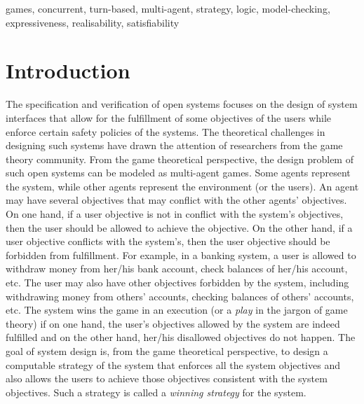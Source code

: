 \documentclass[11pt]{article}
\begin{document}
games, concurrent, turn-based, multi-agent, strategy,  
logic, model-checking, expressiveness, realisability, satisfiability 


\section{Introduction}

The specification and verification of open systems
focuses on the design of system interfaces that allow 
for the fulfillment of some objectives of the users while 
enforce certain safety policies of the systems.
The theoretical challenges in designing such systems 
have drawn the attention of researchers from the game theory community.  
From the game theoretical perspective, the design problem 
of such open systems can be modeled as multi-agent games.  
Some agents represent the system, while 
other agents represent the environment (or the users).  
An agent may have several objectives that may conflict with the other agents' objectives. 
On one hand, if a user objective is not in conflict with the system's objectives, then 
the user should be allowed to achieve the objective. 
On the other hand, if a user objective conflicts with the system's, 
then the user objective should be forbidden from fulfillment.  
For example, in a banking system, a user is allowed to withdraw money from her/his bank account, check balances of her/his account, etc. 
The user may also have other objectives forbidden by the system, 
including withdrawing money from others' accounts, 
checking balances of others' accounts, etc.  
The system wins the game in an execution 
(or a {\em play} in the jargon of game theory) 
if on one hand, the user's objectives allowed by the system are indeed fulfilled 
and on the other hand, her/his disallowed objectives do not happen.  
The goal of system design is, from the game theoretical perspective, 
to design a computable strategy of the system that 
enforces all the system objectives and also allows the users to 
achieve those objectives consistent with the system objectives.  
Such a strategy is called a {\em winning strategy} for the system.  
\end{document}

